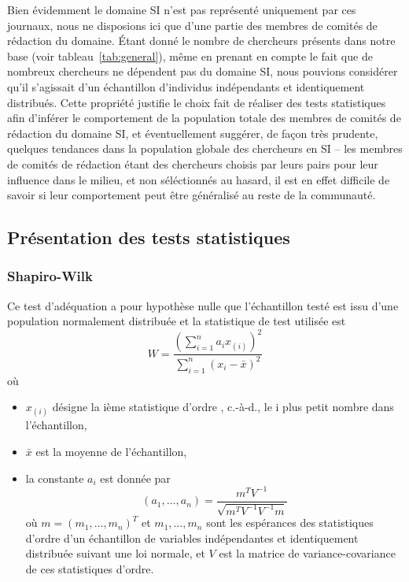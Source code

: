 			Bien évidemment le domaine SI n'est pas représenté uniquement par ces journaux, nous ne disposions ici que d'une partie des membres de comités de rédaction du domaine. Étant donné le nombre de chercheurs présents dans notre base (voir tableau~\ref{tab:general}), même en prenant en compte le fait que de nombreux chercheurs ne dépendent pas du domaine SI, nous pouvions considérer qu'il s'agissait d'un échantillon d'individus indépendants et identiquement distribués. Cette propriété justifie le choix fait de réaliser des tests statistiques afin d'inférer le comportement de la population totale des membres de comités de rédaction du domaine SI, et éventuellement suggérer, de façon très prudente, quelques tendances dans la population globale des chercheurs en SI -- les membres de comités de rédaction étant des chercheurs choisis par leurs pairs pour leur influence dans le milieu, et non séléctionnés au hasard, il est en effet difficile de savoir si leur comportement peut être généralisé au reste de la communauté.
			
	
		\subsection{Présentation des tests statistiques}
			\subsubsection{Shapiro-Wilk \citep{shapiro}}
				Ce test d'adéquation a pour hypothèse nulle que l'échantillon testé est issu d'une population normalement distribuée et la statistique de test utilisée est
			\[
			W = \frac{\left(\sum_{i=1}^{n}a_ix_{(i)}\right)^2}{\sum_{i=1}^{n}\left(x_i-\bar{x}\right)^2}
			\]
			où
			\begin{itemize}
				\item $x_{(i)}$ désigne la ième statistique d'ordre , c.-à-d., le i plus petit nombre dans l'échantillon,
				\item $\bar{x}$ est la moyenne de l'échantillon,
				\item la constante $a_i$ est donnée par
					\[ (a_1, …, a_n) = \frac{m^TV^{-1}}{\sqrt{m^TV^{-1}V^{-1}m}} \]
					où $m = (m_1, …, m_n)^T$ et $m_1, …, m_n$ sont les espérances des statistiques d'ordre d'un échantillon de variables indépendantes et identiquement distribuée suivant une loi normale, et $V$ est la matrice de variance-covariance de ces statistiques d'ordre.
			\end{itemize}
			
			
